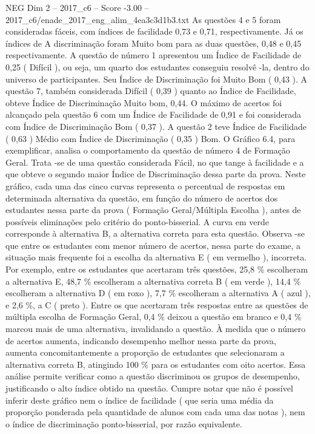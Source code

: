 \begin{textsample}{NEG Dim 2 – 2017\_c6 – Score -3.00 – 2017\_c6/enade\_2017\_eng\_alim\_4ea3c3d1b3.txt}
As questões 4 e 5 foram consideradas fáceis, com índices de facilidade 0,73 e 0,71, respectivamente.
Já os índices de A discriminação foram Muito bom para as duas questões, 0,48 e 0,45 respectivamente.
A questão de número 1 apresentou um Índice de Facilidade de 0,25 ( Difícil ), ou seja, um quarto dos estudantes conseguiu resolvê -la, dentro do universo de participantes.
Seu Índice de Discriminação foi Muito Bom ( 0,43 ).
A questão 7, também considerada Difícil ( 0,39 ) quanto ao Índice de Facilidade, obteve Índice de Discriminação Muito bom, 0,44.
O máximo de acertos foi alcançado pela questão 6 com um Índice de Facilidade de 0,91 e foi considerada com Índice de Discriminação Bom ( 0,37 ).
A questão 2 teve Índice de Facilidade ( 0,63 ) Médio com Índice de Discriminação ( 0,35 ) Bom.
O Gráfico 6.4, para exemplificar, analisa o comportamento da questão de número 4 de Formação Geral.
Trata -se de uma questão considerada Fácil, no que tange à facilidade e a que obteve o segundo maior Índice de Discriminação dessa parte da prova.
Neste gráfico, cada uma das cinco curvas representa o percentual de respostas em determinada alternativa da questão, em função do número de acertos dos estudantes nessa parte da prova ( Formação Geral/Múltipla Escolha ), antes de possíveis eliminações pelo critério do ponto-bisserial.
A curva em verde corresponde à alternativa B, a alternativa correta para esta questão.
Observa -se que entre os estudantes com menor número de acertos, nessa parte do exame, a situação mais frequente foi a escolha da alternativa E ( em vermelho ), incorreta.
Por exemplo, entre os estudantes que acertaram três questões, 25,8 \% escolheram a alternativa E, 48,7 \% escolheram a alternativa correta B ( em verde ), 14,4 \% escolheram a alternativa D ( em roxo ), 7,7 \% escolheram a alternativa A ( azul ), e 2,6 \%, a C ( preto ).
Entre os que acertaram três respostas entre as questões de múltipla escolha de Formação Geral, 0,4 \% deixou a questão em branco e 0,4 \% marcou mais de uma alternativa, invalidando a questão.
À medida que o número de acertos aumenta, indicando desempenho melhor nessa parte da prova, aumenta concomitantemente a proporção de estudantes que selecionaram a alternativa correta B, atingindo 100 \% para os estudantes com oito acertos.
Essa análise permite verificar como a questão discriminou os grupos de desempenho, justificando o alto índice obtido na questão.
Cumpre notar que não é possível inferir deste gráfico nem o índice de facilidade ( que seria uma média da proporção ponderada pela quantidade de alunos com cada uma das notas ), nem o índice de discriminação ponto-bisserial, por razão equivalente.

\end{textsample}
